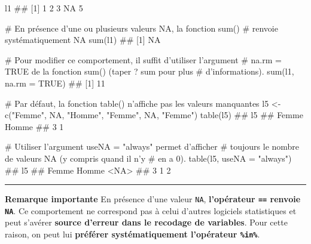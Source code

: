 \documentclass[12pt,twosided, notitlepage]{book}
\newenvironment{Shaded}{}{}
\newcommand{\KeywordTok}[1]{\textcolor[rgb]{0.00,0.00,1.00}{{#1}}}
\newcommand{\DataTypeTok}[1]{{#1}}
\newcommand{\StringTok}[1]{\textcolor[rgb]{0.00,0.50,0.50}{{#1}}}
\newcommand{\CommentTok}[1]{\textcolor[rgb]{0.00,0.50,0.00}{{#1}}}
\newcommand{\OtherTok}[1]{\textcolor[rgb]{1.00,0.25,0.00}{{#1}}}
\newcommand{\NormalTok}[1]{{#1}}
\renewenvironment{Shaded}{\begin{snugshade}}{\end{snugshade}}
\begin{document}
\begin{Shaded}
\begin{Highlighting}[]
\NormalTok{l1}
  \NormalTok{## [1]  1  2  3 NA  5}

\CommentTok{# En présence d'une ou plusieurs valeurs NA, la fonction sum() }
\CommentTok{# renvoie systématiquement NA}
\KeywordTok{sum}\NormalTok{(l1)}
  \NormalTok{## [1] NA}

\CommentTok{# Pour modifier ce comportement, il suffit d'utiliser l'argument }
\CommentTok{# na.rm = TRUE de la fonction sum() (taper ? sum pour plus }
\CommentTok{# d'informations).}
\KeywordTok{sum}\NormalTok{(l1, }\DataTypeTok{na.rm =} \OtherTok{TRUE}\NormalTok{)}
  \NormalTok{## [1] 11}

\CommentTok{# Par défaut, la fonction table() n'affiche pas les valeurs manquantes}
\NormalTok{l5 <-}\StringTok{ }\KeywordTok{c}\NormalTok{(}\StringTok{"Femme"}\NormalTok{, }\OtherTok{NA}\NormalTok{, }\StringTok{"Homme"}\NormalTok{, }\StringTok{"Femme"}\NormalTok{, }\OtherTok{NA}\NormalTok{, }\StringTok{"Femme"}\NormalTok{)}
\KeywordTok{table}\NormalTok{(l5)}
  \NormalTok{## l5}
  \NormalTok{## Femme Homme }
  \NormalTok{##     3     1}

\CommentTok{# Utiliser l'argument useNA = "always" permet d'afficher}
\CommentTok{# toujours le nombre de valeurs NA (y compris quand il n'y}
\CommentTok{# en a 0).}
\KeywordTok{table}\NormalTok{(l5, }\DataTypeTok{useNA =} \StringTok{"always"}\NormalTok{)}
  \NormalTok{## l5}
  \NormalTok{## Femme Homme  <NA> }
  \NormalTok{##     3     1     2}
\end{Highlighting}
\end{Shaded}

\begin{center}\rule{0.5\linewidth}{\linethickness}\end{center}

\textbf{Remarque importante} En présence d'une valeur \texttt{NA},
\textbf{l'opérateur \texttt{==} renvoie \texttt{NA}}\index{\texttt{==}}.
Ce comportement ne correspond pas à celui d'autres logiciels
statistiques et peut s'avérer \textbf{source d'erreur dans le recodage
de variables}. Pour cette raison, on peut lui \textbf{préférer
systématiquement l'opérateur \texttt{\%in\%}}.

\begin{Shaded}
\end{Shaded}
\end{document}
